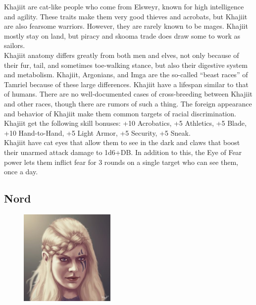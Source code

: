\documentclass[12pt]{book}
\begin{document}
Khajiit are cat-like people who come from Elsweyr, known for high intelligence and agility. These traits make them very good thieves and acrobats, but Khajiit are also fearsome warriors. However, they are rarely known to be mages. Khajiit mostly stay on land, but piracy and skooma trade does draw some to work as sailors.\\

Khajiit anatomy differs greatly from both men and elves, not only because of their fur, tail, and sometimes toe-walking stance, but also their digestive system and metabolism. Khajiit, Argonians, and Imga are the so-called ``beast races'' of Tamriel because of these large differences. Khajiit have a lifespan similar to that of humans. There are no well-documented cases of cross-breeding between Khajiit and other races, though there are rumors of such a thing. The foreign appearance and behavior of Khajiit make them common targets of racial discrimination.\\

Khajiit get the following skill bonuses: +10 Acrobatics, +5 Athletics, +5 Blade, +10 Hand-to-Hand, +5 Light Armor, +5 Security, +5 Sneak.\\

Khajiit have cat eyes that allow them to see in the dark and claws that boost their unarmed attack damage to 1d6+DB. In addition to this, the Eye of Fear power lets them inflict fear for 3 rounds on a single target who can see them, once a day.

\subsection{Nord}
\begin{figure}
	\includegraphics[width=\textwidth]{Nord.png}
\end{figure}
\end{document}
